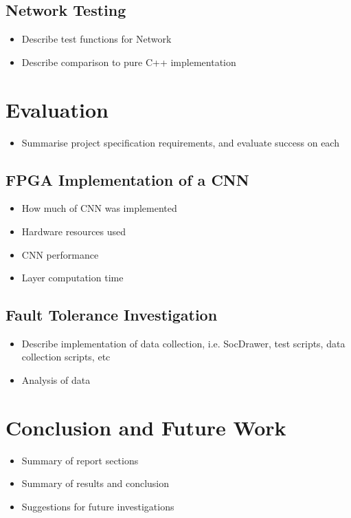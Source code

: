 \documentclass[12pt]{article}
\begin{document}
\subsection{Network Testing}
\label{sec:Test-Network}


\begin{itemize}
\item Describe test functions for Network
\item Describe comparison to pure C++ implementation
\end{itemize}

\newpage

\section{Evaluation}
\label{sec:Eval}


\begin{itemize}
\item Summarise project specification requirements, and evaluate success on each
\end{itemize}

\subsection{FPGA Implementation of a CNN}
\label{sec:Eval-FPGAImplOfCnn}


\begin{itemize}
\item How much of CNN was implemented
\item Hardware resources used
\item CNN performance
\item Layer computation time
\end{itemize}

\subsection{Fault Tolerance Investigation}
\label{sec:Eval-FaultTolInv}


\begin{itemize}
\item Describe implementation of data collection, i.e. SocDrawer, test scripts, data collection scripts, etc
\item Analysis of data
\end{itemize}

\newpage

\section{Conclusion and Future Work}
\label{sec:Conclusion}


\begin{itemize}
\item Summary of report sections
\item Summary of results and conclusion
\item Suggestions for future investigations
\end{itemize}

\newpage



\nocite{*}
\end{document}
